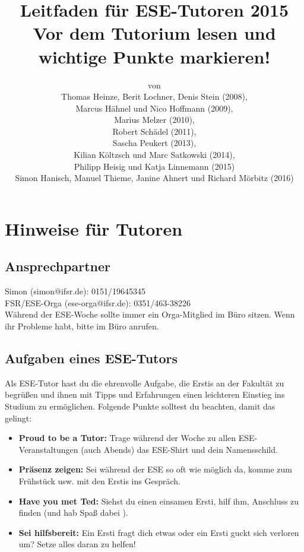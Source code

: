 \documentclass[a4paper,12pt]{report}
\begin{document}
\title{\textbf{Leitfaden für ESE-Tutoren 2015}\\
Vor dem Tutorium lesen und wichtige Punkte markieren!}
\date{}
\author{von\\Thomas Heinze, Berit Lochner, Denis Stein (2008), \\Marcus Hähnel und Nico Hoffmann (2009), \\Marius Melzer (2010), \\Robert Schädel (2011),\\Sascha Peukert (2013), \\Kilian Költzsch und Marc Satkowski (2014), \\Philipp Heisig und Katja Linnemann (2015) \\Simon Hanisch, Manuel Thieme, Janine Ahnert und Richard Mörbitz (2016)}
\maketitle
\tableofcontents
\chapter{Hinweise für Tutoren}
\section{Ansprechpartner}
Simon (simon@ifsr.de): 0151/19645345\\
FSR/ESE-Orga (ese-orga@ifsr.de): 0351/463-38226 \\

Während der ESE-Woche sollte immer ein Orga-Mitglied im Büro sitzen. Wenn ihr Probleme habt, bitte im Büro anrufen.

\section{Aufgaben eines ESE-Tutors}
Als ESE-Tutor hast du die ehrenvolle Aufgabe, die Erstis an der Fakultät zu begrüßen und ihnen mit Tipps und Erfahrungen einen leichteren Einstieg ins Studium zu ermöglichen. Folgende Punkte solltest du beachten, damit das gelingt:
\begin{itemize}
	\item \textbf{Proud to be a Tutor:} Trage während der Woche zu allen ESE-Veranstaltungen (auch Abends) das ESE-Shirt und dein Namensschild.
	\item \textbf{Präsenz zeigen:} Sei während der ESE so oft wie möglich da, komme zum Frühstück usw. mit den Erstis ins Gespräch.
	\item \textbf{Have you met Ted:} Siehst du einen einsamen Ersti, hilf ihm, Anschluss zu finden (und hab Spaß dabei \Winkey ).
	\item \textbf{Sei hilfsbereit:} Ein Ersti fragt dich etwas oder ein Ersti guckt sich verloren um? Setze alles daran zu helfen!
\end{itemize}
\end{document}

